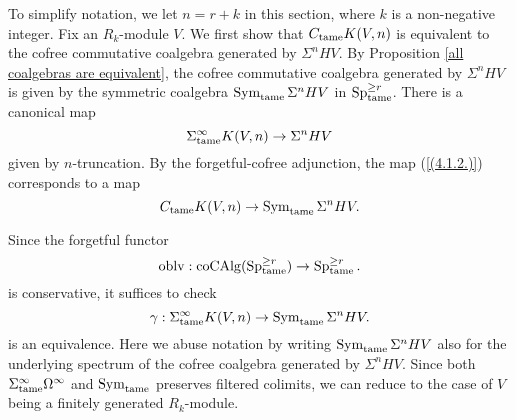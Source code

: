 
To simplify notation, we let $n=r+k$ in this section, where $k$ is a non-negative integer. 
Fix an  $R_{k}$-module $V$.
We first show that $C_{\operatorname{\operatorname{tame}}}K(V, n)$ is equivalent to the cofree commutative coalgebra generated by $\Sigma^{n}HV$.
By Proposition \ref{all coalgebras are equivalent}, the cofree commutative coalgebra generated by $\Sigma^{n}HV$ is given by the symmetric coalgebra 
$\operatorname{Sym}_{\operatorname{\operatorname{tame}}} \Sigma^{n}HV$ in $\operatorname{Sp}^{\geq r}_{\operatorname{\operatorname{tame}}}$.
There is a canonical map 
\begin{equation}
\label{(4.1.2.)}
    \Sigma_{\operatorname{\operatorname{tame}}}^{\infty}K(V,n)\to  \Sigma^{n}HV
\end{equation}
given by $n$-truncation. By the forgetful-cofree adjunction, the map (\ref{(4.1.2.)}) corresponds to a map
\begin{equation}
    C_{\operatorname{\operatorname{tame}}}K(V,n)\to \operatorname{Sym}_{\operatorname{\operatorname{tame}}} \Sigma^{n}HV.
\end{equation}

Since the forgetful functor 
$$
\operatorname{oblv}: \operatorname{coCAlg}(\operatorname{Sp}^{\geq r}_{\operatorname{\operatorname{tame}}}) \to 
\operatorname{Sp}^{\geq r}_{\operatorname{\operatorname{tame}}}.
$$
is conservative, it suffices to check
\begin{equation}
\label{(4.1.1.)}
\gamma:  \Sigma^{\infty}_{\operatorname{\operatorname{tame}}}K(V,n)\to \operatorname{Sym}_{\operatorname{\operatorname{tame}}} \Sigma^{n}HV.
\end{equation}
is an equivalence. Here we abuse notation by writing $\operatorname{Sym}_{\operatorname{\operatorname{tame}}} \Sigma^{n}HV$ also for the underlying spectrum of the cofree coalgebra generated by $\Sigma^{n}HV$.
Since both $\Sigma^{\infty}_{\operatorname{\operatorname{tame}}}\Omega^{\infty}$ and $\operatorname{Sym}_{\operatorname{\operatorname{tame}}}$ preserves filtered colimits, we can reduce to the case of $V$ being a finitely generated $R_k$-module. 

